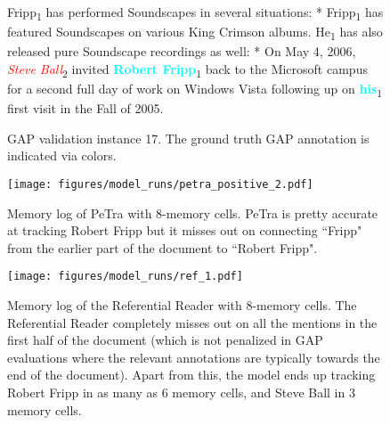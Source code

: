 \documentclass[11pt,a4paper]{article}
\newcommand{\modelname}{PeTra\xspace}
\newcommand{\hlent}[2]{\colorbox{gray!30}{#1\textsubscript{#2}}}
\begin{document}
\begin{figure*}[h]
    \begin{subfigure}[t]{\textwidth}
    \begin{mdframed}
        \hlent{Fripp}{1} has performed Soundscapes in several situations: * \hlent{Fripp}{1} has featured Soundscapes on various King Crimson albums. \hlent{He}{1} has also released pure Soundscape recordings as well: * On May 4, 2006, \hlent{\textcolor{red}{\it Steve Ball}}{2} invited \hlent{\textcolor{aqua}{\bf Robert Fripp}}{1} back to the Microsoft campus for a second full day of work on Windows Vista following up on \hlent{\textcolor{aqua}{\bf his}}{1} first visit in the Fall of 2005.
    \end{mdframed}
    \caption{GAP validation instance 17. The ground truth GAP annotation is indicated via colors.}
    \end{subfigure}
    \centering
    \begin{subfigure}[t]{\textwidth}
    \texttt{[image: figures/model\_runs/petra\_positive\_2.pdf]}
    \caption{Memory log of \modelname with 8-memory cells. \modelname is pretty accurate at tracking Robert Fripp but it misses out on connecting ``Fripp" from the earlier part of the document to ``Robert Fripp". }
    \end{subfigure}
    \begin{subfigure}[t]{\textwidth}
    \texttt{[image: figures/model\_runs/ref\_1.pdf]}
    \caption{Memory log of the Referential Reader with 8-memory cells. The Referential Reader completely misses out on all the mentions in the first half of the document (which is not penalized in GAP evaluations where the relevant annotations are typically towards the end of the document). Apart from this, the model ends up tracking Robert Fripp in as many as 6 memory cells, and Steve Ball in 3 memory cells.}
    \end{subfigure}
    \caption{\modelname clearly performs better than the Referential Reader at people tracking for this instance. \modelname's output is more sparse, detects more relevant mentions, and is better at maintaining a 1-to-1 correspondence between memory cells and people.}
    \label{fig:petra_vs_ref_2}
\end{figure*}
 
\end{document}
